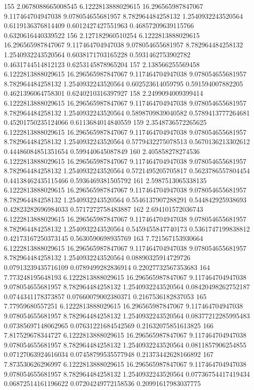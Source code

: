 {155 2.0678088665008545 6.1222813888029615 16.296565987847067 9.117464704947038 9.078054655681957 8.782964484258132 1.2540932243520564 0.6119136376814409 0.6012427427551963 0.46857209639115766 0.6320616440339522
156 2.127182960510254 6.1222813888029615 16.296565987847067 9.117464704947038 9.078054655681957 8.782964484258132 1.2540932243520564 0.6038171703165228 0.5931462753902782 0.4631744514812123 0.6253145878965204
157 2.138566255569458 6.1222813888029615 16.296565987847067 9.117464704947038 9.078054655681957 8.782964484258132 1.2540932243520564 0.602523614059795 0.591594007882205 0.4621396064758301 0.6240210316397927
158 2.2499094009399414 6.1222813888029615 16.296565987847067 9.117464704947038 9.078054655681957 8.782964484258132 1.2540932243520564 0.5898709839040582 0.5789413777264681 0.45201750235124066 0.6113684014840559
159 2.3548736572265625 6.1222813888029615 16.296565987847067 9.117464704947038 9.078054655681957 8.782964484258132 1.2540932243520564 0.5779432275078513 0.5670136213302612 0.44486084851351654 0.599440645087849
160 2.405858278274536 6.1222813888029615 16.296565987847067 9.117464704947038 9.078054655681957 8.782964484258132 1.2540932243520564 0.5721495205705817 0.5623786557804454 0.44138462435115466 0.5936469381505792
161 2.5987513065338135 6.1222813888029615 16.296565987847067 9.117464704947038 9.078054655681957 8.782964484258132 1.2540932243520564 0.5546137907288291 0.544842925938693 0.42823282696984033 0.5717272758483887
162 2.694101572036743 6.1222813888029615 16.296565987847067 9.117464704947038 9.078054655681957 8.782964484258132 1.2540932243520564 0.5459455847740173 0.5361747199838812 0.42173167250373145 0.5630590698935769
163 7.721567153930664 6.1222813888029615 16.296565987847067 9.117464704947038 9.078054655681957 8.782964484258132 1.2540932243520564 0.08890325914729726 0.07913239435716109 0.0789499282836914 0.22027732567353683
164 7.773248195648193 6.1222813888029615 16.296565987847067 9.117464704947038 9.078054655681957 8.782964484258132 1.2540932243520564 0.08420498262752187 0.0744341178373857 0.07660079002380371 0.2167536182837053
165 7.77959680557251 6.1222813888029615 16.296565987847067 9.117464704947038 9.078054655681957 8.782964484258132 1.2540932243520564 0.08377212285995483 0.07385697148062965 0.07631221684542569 0.21632075851613825
166 7.817529678344727 6.1222813888029615 16.296565987847067 9.117464704947038 9.078054655681957 8.782964484258132 1.2540932243520564 0.0811857906254855 0.07127063924616034 0.07458799535577948 0.21373442628166892
167 7.873530626296997 6.1222813888029615 16.296565987847067 9.117464704947038 9.078054655681957 8.782964484258132 1.2540932243520564 0.07736754417419434 0.06872514161196622 0.07204249772158536 0.20991617983037775
}
